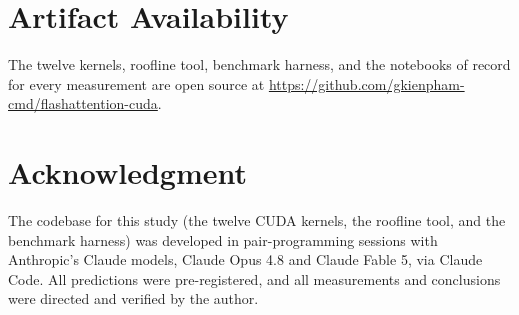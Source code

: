 \documentclass[conference]{IEEEtran}
\begin{document}








\section*{Artifact Availability}
The twelve kernels, roofline tool, benchmark harness, and the notebooks of record
for every measurement are open source at
\url{https://github.com/gkienpham-cmd/flashattention-cuda}.

\section*{Acknowledgment}
The codebase for this study (the twelve CUDA kernels, the roofline tool, and the
benchmark harness) was developed in pair-programming sessions with Anthropic's
Claude models, Claude Opus 4.8 and Claude Fable 5, via Claude Code. All
predictions were pre-registered, and all measurements and conclusions were
directed and verified by the author.



\end{document}

